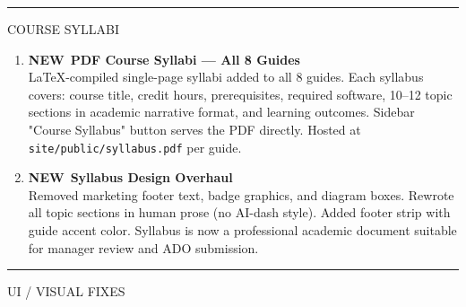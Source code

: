 \documentclass[10pt]{article}
\newcommand{\feat}{\textcolor{sgreen}{\small\bfseries NEW}}
\begin{document}
\smallskip
{\color{snavy}\rule{\linewidth}{0.4pt}}
\smallskip

{\small\sffamily\color{sgray}\MakeUppercase{Course Syllabi}}
\smallskip

\begin{enumerate}[resume]\small
  \item \feat\ \textbf{PDF Course Syllabi — All 8 Guides} \\
    LaTeX-compiled single-page syllabi added to all 8 guides. Each syllabus covers: course title, credit hours, prerequisites, required software, 10--12 topic sections in academic narrative format, and learning outcomes. Sidebar "Course Syllabus" button serves the PDF directly. Hosted at \texttt{site/public/syllabus.pdf} per guide.

  \item \feat\ \textbf{Syllabus Design Overhaul} \\
    Removed marketing footer text, badge graphics, and diagram boxes. Rewrote all topic sections in human prose (no AI-dash style). Added footer strip with guide accent color. Syllabus is now a professional academic document suitable for manager review and ADO submission.
\end{enumerate}

\smallskip
{\color{snavy}\rule{\linewidth}{0.4pt}}
\smallskip

{\small\sffamily\color{sgray}\MakeUppercase{UI / Visual Fixes}}
\smallskip
\end{document}
